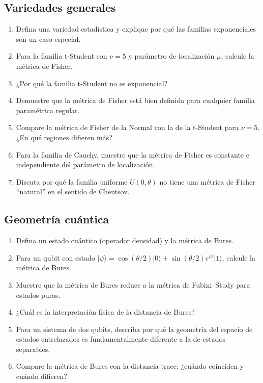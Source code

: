 \subsection*{Variedades generales}
\begin{enumerate}
	\item[$\star$] Defina una variedad estadística y explique por qué las familias exponenciales son un caso especial.
	\item[$\star\star$] Para la familia t-Student con $\nu = 5$ y parámetro de localización $\mu$, calcule la métrica de Fisher.
	\item[$\star$] ¿Por qué la familia t-Student no es exponencial?
	\item[$\star\star\star$] Demuestre que la métrica de Fisher está bien definida para cualquier familia paramétrica regular.
	\item[$\star\star$] Compare la métrica de Fisher de la Normal con la de la t-Student para $\nu = 5$.  ¿En qué regiones difieren más?
	\item[$\star\star\star$] Para la familia de Cauchy, muestre que la métrica de Fisher es constante e independiente del parámetro de localización.
	\item[$\star\star\star$] Discuta por qué la familia uniforme $U(0, \theta)$ no tiene una métrica de Fisher ``natural'' en el sentido de Chentsov.
\end{enumerate}

\subsection*{Geometría cuántica}
\begin{enumerate}[resume]
	\item[$\star$] Defina un estado cuántico (operador densidad) y la métrica de Bures.
	\item[$\star\star$] Para un qubit con estado $|\psi\rangle = \cos(\theta/2)|0\rangle + \sin(\theta/2)e^{i\phi}|1\rangle$, calcule la métrica de Bures.
	\item[$\star\star\star$] Muestre que la métrica de Bures reduce a la métrica de Fubini--Study para estados puros.
	\item[$\star$] ¿Cuál es la interpretación física de la distancia de Bures?
	\item[$\star\star\star$] Para un sistema de dos qubits, describa por qué la geometría del espacio de estados entrelazados es fundamentalmente diferente a la de estados separables.
	\item[$\star\star$] Compare la métrica de Bures con la distancia trace: ¿cuándo coinciden y cuándo difieren?
\end{enumerate}

